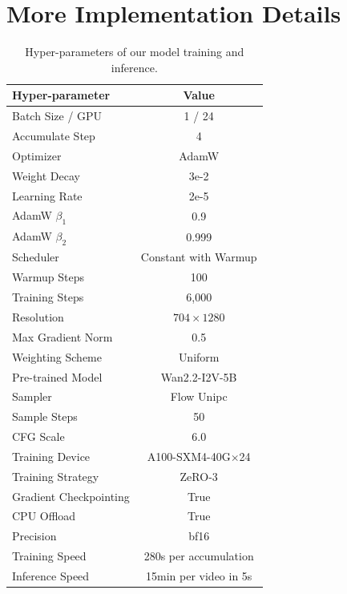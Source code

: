 \setcounter{page}{1}

\appendix
\setcounter{figure}{0}
\setcounter{table}{0}

\section{More Implementation Details}
\label{sec:more_implementation_detail}
\begin{table}
    \centering
    \scriptsize
    \setlength{\tabcolsep}{0.01pt}
    \vspace{-20pt}
    \begin{tabular}{lc}
        \toprule
        Hyper-parameter & Value\\
        \midrule
        Batch Size / GPU & 1 / 24\\
        Accumulate Step & 4\\
        Optimizer & AdamW\\
        Weight Decay & 3e-2\\
        Learning Rate & 2e-5\\
        AdamW $\beta_1$ & 0.9\\
        AdamW $\beta_2$ & 0.999\\
        Scheduler & Constant with Warmup\\
        Warmup Steps & 100\\
        Training Steps & 6,000\\
        Resolution & $704\times 1280$\\
        Max Gradient Norm & 0.5 \\
        Weighting Scheme & Uniform\\
        Pre-trained Model & Wan2.2-I2V-5B\\
        \midrule
        Sampler & Flow Unipc\\
        Sample Steps & 50\\
        CFG Scale & 6.0\\
        \midrule
        Training Device & A100-SXM4-40G$\times$24\\
        Training Strategy & ZeRO-3\\
        Gradient Checkpointing & True\\
        CPU Offload & True\\
        Precision & bf16\\
        \midrule
        Training Speed & 280s per accumulation\\
        Inference Speed & 15min per video in 5s\\
        \bottomrule
    \end{tabular}
    \vspace{-2pt}
    \caption{Hyper-parameters of our model training and inference.}
    \label{tab:hyperparam}
    \vspace{-10pt}
\end{table}

